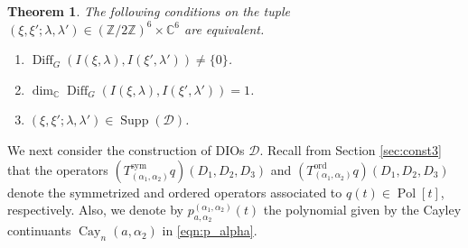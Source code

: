 \documentclass[a4paper,11pt,reqno]{amsart}
\newcommand{\calD}{\mathcal{D}}
\newcommand{\0}{{\bf 0}}
\newcommand{\Z}{\mathbb{Z}}
\newcommand{\C}{\mathbb{C}}
\newcommand{\1}{{\bf 1}}
\DeclareMathOperator{\Cay}{Cay}
\DeclareMathOperator{\Pol}{Pol}
\newcommand{\ord}{{\mathrm{ord}}}
\DeclareMathOperator{\Supp}{Supp}
\DeclareMathOperator{\Diff}{Diff}
\theoremstyle{plain}
\newtheorem{theorem}[equation]{Theorem}
\theoremstyle{definition}
\numberwithin{equation}{section}
\theoremstyle{definition}
\begin{document}
\begin{theorem}\label{thm:class_DIOs}
The following conditions on the tuple $(\xi, \xi'; \lambda, \lambda') \in (\Z/2\Z)^6 \times \C^6$ are equivalent.
\begin{enumerate}[label = \normalfont{(\roman*)}]
    \item $\Diff_{G}\left(I(\xi, \lambda), I(\xi', \lambda')\right) \neq \{0\}$.
    
    \item $\dim_\C \Diff_{G}\left(I(\xi, \lambda), I(\xi', \lambda')\right) = 1$.

    \item $(\xi, \xi'; \lambda, \lambda') \in \Supp(\calD)$.
\end{enumerate}
\end{theorem}

We next consider the construction of DIOs $\calD$.
Recall from Section \ref{sec:const3} that the operators
$(T^{\mathrm{sym}}_{(\alpha_1, \alpha_2)} q)(D_1, D_2, D_3)$
and
$(T^\ord_{(\alpha_1, \alpha_2)} q)(D_1, D_2, D_3)$ 
denote
the symmetrized and ordered operators
associated to 
$q(t) \in \Pol[t]$, respectively.
Also, we denote by
$p_{a,\alpha_2}^{(\alpha_1, \alpha_2)}(t)$
the polynomial given by the Cayley continuants $\Cay_n(a,\alpha_2)$
in \eqref{eqn:p_alpha}.
\end{document}
